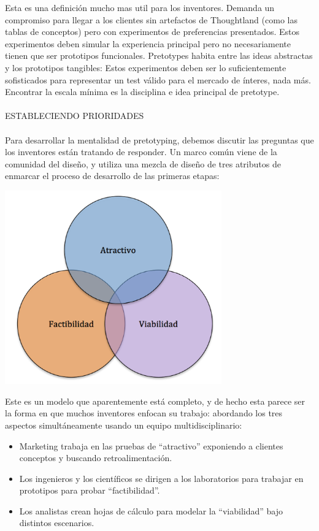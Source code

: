 \documentclass{article}
\begin{document}
Esta es una definici\'on mucho mas util para los inventores. Demanda un compromiso para llegar a los clientes sin artefactos de Thoughtland (como las tablas de conceptos) pero con experimentos de preferencias presentados.  Estos experimentos deben simular la experiencia principal pero no necesariamente tienen que ser prototipos funcionales.  Pretotypes habita entre las ideas abstractas y los prototipos tangibles: Estos experimentos deben ser lo suficientemente sofisticados para representar un test v\'alido para el mercado de \'interes, nada m\'as. Encontrar la escala m\'inima es la disciplina e idea principal de pretotype.
\\ \\
ESTABLECIENDO PRIORIDADES
\\ \\
Para desarrollar la mentalidad de pretotyping, debemos discutir las preguntas que los inventores est\'an tratando de responder. Un marco com\'un viene de la comunidad del dise\~no, y utiliza una mezcla de dise\~no de tres atributos de enmarcar el proceso de desarrollo de las primeras etapas:

\begin{center}
    \includegraphics[width=0.7\textwidth]{3_burbujas}
\end{center}

Este es un modelo que aparentemente est\'a completo, y de hecho esta parece ser la forma en que muchos inventores enfocan su trabajo: abordando los tres aspectos simult\'aneamente usando un equipo multidisciplinario:

\begin{itemize}
\item Marketing trabaja en las pruebas de ``atractivo'' exponiendo a clientes conceptos y buscando retroalimentaci\'on.
\item Los ingenieros y los cient\'ificos se dirigen a los laboratorios para trabajar en prototipos para probar ``factibilidad''.
\item Los analistas crean hojas de c\'alculo para modelar la ``viabilidad'' bajo distintos escenarios.
\end{itemize}
\end{document}

